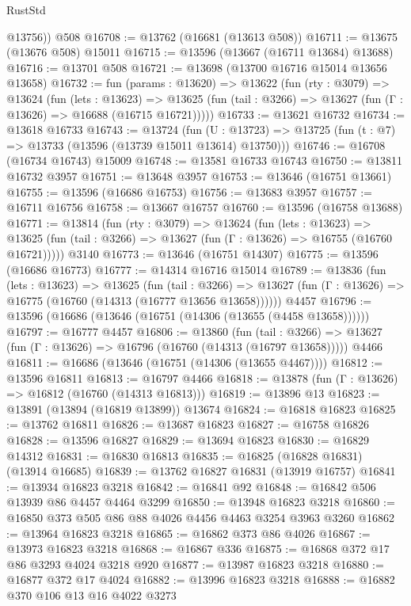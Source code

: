 \begin{lexlean}{RustStd}
\begin{coremodule}
        @13756))
    @508
@16708 := @13762 (@16681 (@13613 @508))
@16711 := @13675 (@13676 @508) @15011
@16715 := @13596 (@13667 (@16711 @13684) @13688)
@16716 := @13701 @508
@16721 := @13698 (@13700 @16716 @15014 @13656 @13658)
@16732 := fun (params : @13620) =>
  @13622
    (fun (rty : @3079) =>
    @13624
      (fun (lets : @13623) =>
      @13625 (fun (tail : @3266) => @13627 (fun (Γ : @13626) => @16688 (@16715 @16721)))))
@16733 := @13621 @16732
@16734 := @13618 @16733
@16743 := @13724
    (fun (U : @13723) => @13725 (fun (t : @7) => @13733 (@13596 (@13739 @15011 @13614) @13750)))
@16746 := @16708 (@16734 @16743) @15009
@16748 := @13581 @16733 @16743
@16750 := @13811 @16732 @3957
@16751 := @13648 @3957
@16753 := @13646 (@16751 @13661)
@16755 := @13596 (@16686 @16753)
@16756 := @13683 @3957
@16757 := @16711 @16756
@16758 := @13667 @16757
@16760 := @13596 (@16758 @13688)
@16771 := @13814
    (fun (rty : @3079) =>
    @13624
      (fun (lets : @13623) =>
      @13625 (fun (tail : @3266) => @13627 (fun (Γ : @13626) => @16755 (@16760 @16721)))))
    @3140
@16773 := @13646 (@16751 @14307)
@16775 := @13596 (@16686 @16773)
@16777 := @14314 @16716 @15014
@16789 := @13836
    (fun (lets : @13623) =>
    @13625
      (fun (tail : @3266) =>
      @13627 (fun (Γ : @13626) => @16775 (@16760 (@14313 (@16777 @13656 @13658))))))
    @4457
@16796 := @13596 (@16686 (@13646 (@16751 (@14306 (@13655 (@4458 @13658))))))
@16797 := @16777 @4457
@16806 := @13860
    (fun (tail : @3266) => @13627 (fun (Γ : @13626) => @16796 (@16760 (@14313 (@16797 @13658)))))
    @4466
@16811 := @16686 (@13646 (@16751 (@14306 (@13655 @4467))))
@16812 := @13596 @16811
@16813 := @16797 @4466
@16818 := @13878 (fun (Γ : @13626) => @16812 (@16760 (@14313 @16813)))
@16819 := @13896 @13
@16823 := @13891 (@13894 (@16819 @13899)) @13674
@16824 := @16818 @16823
@16825 := @13762 @16811
@16826 := @13687 @16823
@16827 := @16758 @16826
@16828 := @13596 @16827
@16829 := @13694 @16823
@16830 := @16829 @14312
@16831 := @16830 @16813
@16835 := @16825 (@16828 @16831) (@13914 @16685)
@16839 := @13762 @16827 @16831 (@13919 @16757)
@16841 := @13934 @16823 @3218
@16842 := @16841 @92
@16848 := @16842 @506 @13939 @86 @4457 @4464 @3299
@16850 := @13948 @16823 @3218
@16860 := @16850 @373 @505 @86 @88 @4026 @4456 @4463 @3254 @3963 @3260
@16862 := @13964 @16823 @3218
@16865 := @16862 @373 @86 @4026
@16867 := @13973 @16823 @3218
@16868 := @16867 @336
@16875 := @16868 @372 @17 @86 @3293 @4024 @3218 @920
@16877 := @13987 @16823 @3218
@16880 := @16877 @372 @17 @4024
@16882 := @13996 @16823 @3218
@16888 := @16882 @370 @106 @13 @16 @4022 @3273

\end{coremodule}
\end{lexlean}
